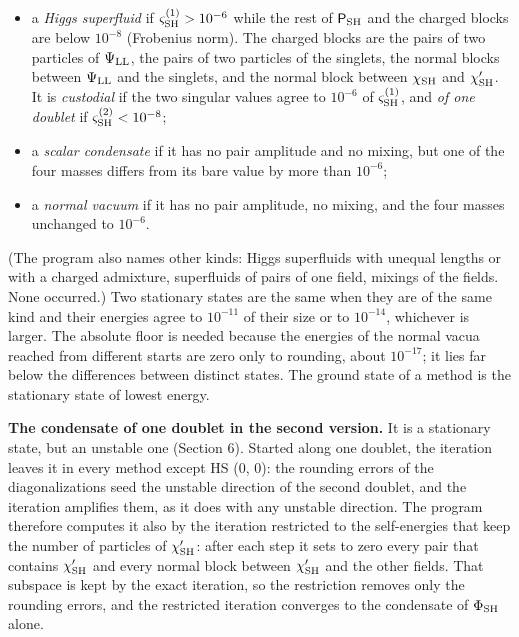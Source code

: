 \documentclass[
  10pt,
]{article}
\providecommand{\tightlist}{%
  \setlength{\itemsep}{0pt}\setlength{\parskip}{0pt}}
\begin{document}
\begin{itemize}
\tightlist
\item
  a \emph{Higgs superfluid} if \(\varsigma^{(1)}_{\rm SH}>10^{-6}\)
  while the rest of \(\mathsf P_{\rm SH}\) and the charged blocks are
  below \(10^{-8}\) (Frobenius norm). The charged blocks are the pairs
  of two particles of \(\Psi_{\rm LL}\), the pairs of two particles of
  the singlets, the normal blocks between \(\Psi_{\rm LL}\) and the
  singlets, and the normal block between \(\chi_{\rm SH}\) and
  \(\chi'_{\rm SH}\). It is \emph{custodial} if the two singular values
  agree to \(10^{-6}\) of \(\varsigma^{(1)}_{\rm SH}\), and \emph{of one
  doublet} if \(\varsigma^{(2)}_{\rm SH}<10^{-8}\);
\item
  a \emph{scalar condensate} if it has no pair amplitude and no mixing,
  but one of the four masses differs from its bare value by more than
  \(10^{-6}\);
\item
  a \emph{normal vacuum} if it has no pair amplitude, no mixing, and the
  four masses unchanged to \(10^{-6}\).
\end{itemize}

(The program also names other kinds: Higgs superfluids with unequal
lengths or with a charged admixture, superfluids of pairs of one field,
mixings of the fields. None occurred.) Two stationary states are the
same when they are of the same kind and their energies agree to
\(10^{-11}\) of their size or to \(10^{-14}\), whichever is larger. The
absolute floor is needed because the energies of the normal vacua
reached from different starts are zero only to rounding, about
\(10^{-17}\); it lies far below the differences between distinct states.
The ground state of a method is the stationary state of lowest energy.

\textbf{The condensate of one doublet in the second version.} It is a
stationary state, but an unstable one (Section 6). Started along one
doublet, the iteration leaves it in every method except HS (0, 0): the
rounding errors of the diagonalizations seed the unstable direction of
the second doublet, and the iteration amplifies them, as it does with
any unstable direction. The program therefore computes it also by the
iteration restricted to the self-energies that keep the number of
particles of \(\chi'_{\rm SH}\): after each step it sets to zero every
pair that contains \(\chi'_{\rm SH}\) and every normal block between
\(\chi'_{\rm SH}\) and the other fields. That subspace is kept by the
exact iteration, so the restriction removes only the rounding errors,
and the restricted iteration converges to the condensate of
\(\Phi_{\rm SH}\) alone.
\end{document}
